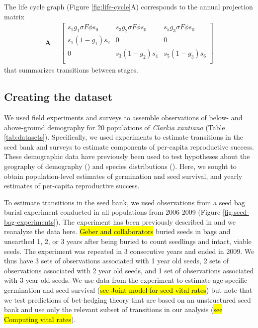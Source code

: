 \documentclass[12pt, oneside, titlepage]{article}   	%
\begin{document}
{The life cycle graph (Figure \ref{fig:life-cycle}A) corresponds to the annual projection matrix
%
\begin{gather}
\bm{A} = 
\begin{bmatrix} 
s_1 g_1 \sigma F \phi s_0 & s_3 g_2 \sigma F \phi s_0 & s_5 g_3 \sigma F \phi s_0 \\
s_1 (1-g_1) s_2 & 0 & 0 \\
0 & s_3 (1-g_2) s_4  & s_5 (1-g_3) s_6  \\
\end{bmatrix}
\label{eq:projection-matrix}
\end{gather} 
%
that summarizes transitions between stages. 

\subsection{Creating the dataset}

We used field experiments and surveys to assemble observations of below- and above-ground demography for 20 populations of \textit{Clarkia xantiana} (Table \ref{tab:datasets}). Specifically, we used experiments to estimate transitions in the seed bank and surveys to estimate components of per-capita reproductive success. These demographic data have previously been used to test hypotheses about the geography of demography (\cite{eckhart2011}) and species distributions (\cite{pironon2018}). Here, we sought to obtain population-level estimates of germination and seed survival, and yearly estimates of per-capita reproductive success.

To estimate transitions in the seed bank, we used observations from a seed bag burial experiment conducted in all populations from 2006-2009 (Figure \ref{fig:seed-bag-experiments}). The experiment has been previously described in \cite{eckhart2011} and we reanalyze the data here. \hl{Geber and collaborators} buried seeds in bags and unearthed 1, 2, or 3 years after being buried to count seedlings and intact, viable seeds. The experiment was repeated in 3 consecutive years and ended in 2009. We thus have 3 sets of observations associated with 1 year old seeds, 2 sets of observations associated with 2 year old seeds, and 1 set of observations associated with 3 year old seeds. We use data from the experiment to estimate age-specific germination and seed survival (\hl{see Joint model for seed vital rates}) but note that we test predictions of bet-hedging theory that are based on an unstructured seed bank and use only the relevant subset of transitions in our analysis (\hl{see Computing vital rates}).

}
\end{document}

